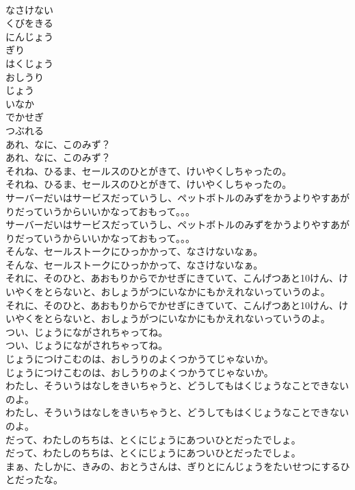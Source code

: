 \documentclass[8pt]{extreport}
\begin{document}
\begin{CJK}{UTF8}{min}
\\	なさけない
\\	くびをきる
\\	にんじょう
\\	ぎり
\\	はくじょう
\\	おしうり
\\	じょう
\\	いなか
\\	でかせぎ
\\	つぶれる
\\	あれ、なに、このみず？	
\\	あれ、なに、このみず？ 
\\	それね、ひるま、セールスのひとがきて、けいやくしちゃったの。	
\\	それね、ひるま、セールスのひとがきて、けいやくしちゃったの。 
\\	サーバーだいはサービスだっていうし、ペットボトルのみずをかうよりやすあがりだっていうからいいかなっておもって。。。	
\\	サーバーだいはサービスだっていうし、ペットボトルのみずをかうよりやすあがりだっていうからいいかなっておもって。。。 
\\	そんな、セールストークにひっかかって、なさけないなぁ。	
\\	そんな、セールストークにひっかかって、なさけないなぁ。 
\\	それに、そのひと、あおもりからでかせぎにきていて、こんげつあと10けん、けいやくをとらないと、おしょうがつにいなかにもかえれないっていうのよ。	
\\	それに、そのひと、あおもりからでかせぎにきていて、こんげつあと10けん、けいやくをとらないと、おしょうがつにいなかにもかえれないっていうのよ。 
\\	つい、じょうにながされちゃってね。	
\\	つい、じょうにながされちゃってね。 
\\	じょうにつけこむのは、おしうりのよくつかうてじゃないか。	
\\	じょうにつけこむのは、おしうりのよくつかうてじゃないか。 
\\	わたし、そういうはなしをきいちゃうと、どうしてもはくじょうなことできないのよ。	
\\	わたし、そういうはなしをきいちゃうと、どうしてもはくじょうなことできないのよ。 
\\	だって、わたしのちちは、とくにじょうにあついひとだったでしょ。	
\\	だって、わたしのちちは、とくにじょうにあついひとだったでしょ。 
\\	まぁ、たしかに、きみの、おとうさんは、ぎりとにんじょうをたいせつにするひとだったな。	

\end{CJK}
\end{document}
